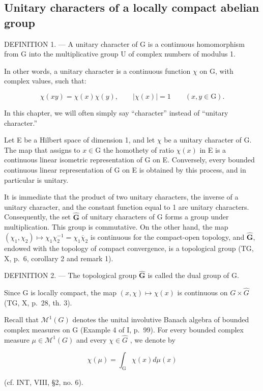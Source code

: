 \subsection{Unitary characters of a locally compact abelian group}

DEFINITION 1. --- A unitary character of G is a continuous homomorphism from G into the multiplicative group U of complex numbers of modulus 1.

In other words, a unitary character is a continuous function \(\chi\) on G, with complex values, such that:

\[
\chi (x y) = \chi (x) \chi (y), \qquad | \chi (x) | = 1 \qquad (x, y \in \mathrm{G}).
\]

In this chapter, we will often simply say “character” instead of “unitary character.”

Let E be a Hilbert space of dimension 1, and let \(\chi\) be a unitary character of G. The map that assigns to \(x \in \mathrm{G}\) the homothety of ratio \(\chi(x)\) in E is a continuous linear isometric representation of G on E. Conversely, every bounded continuous linear representation of G on E is obtained by this process, and in particular is unitary.

It is immediate that the product of two unitary characters, the inverse of a unitary character, and the constant function equal to 1 are unitary characters. Consequently, the set \(\widehat{\mathbf{G}}\) of unitary characters of G forms a group under multiplication. This group is commutative. On the other hand, the map \((\chi_1,\chi_2)\mapsto \chi_1\chi_2^{-1} = \chi_1\overline{\chi}_2\) is continuous for the compact-open topology, and \(\widehat{\mathbf{G}}\), endowed with the topology of compact convergence, is a topological group (TG, X, p.~6, corollary 2 and remark 1).

DEFINITION 2. --- The topological group \(\widehat{\mathbf{G}}\) is called the dual group of G.

Since G is locally compact, the map \((x,\chi)\mapsto\chi(x)\) is continuous on \(G\times\widehat{G}\) (TG, X, p.~28, th. 3).

Recall that \(\mathcal{M}^{1}(G)\) denotes the unital involutive Banach algebra of bounded complex measures on G (Example 4 of I, p.~99). For every bounded complex measure \(\mu\in\mathcal{M}^{1}(G)\) and every \(\chi\in\widehat{G}\) , we denote by

\[
\chi (\mu) = \int_ {\mathrm{G}} \chi (x) d \mu (x)\tag{1}
\]

(cf. INT, VIII, §2, no. 6).


